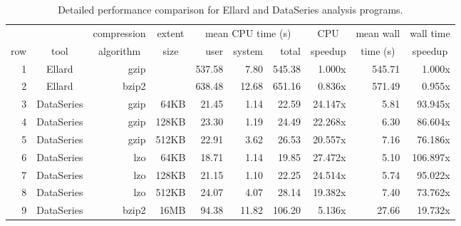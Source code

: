 \documentclass{acm_proc_article-sp}
\begin{document}

\begin{table*}
\centering
\caption{
Detailed performance comparison for Ellard and DataSeries analysis programs.}
\begin{tabular}{|r||c|r|r|r|r|r|r|r|r|} \hline
 &  & \multicolumn{1}{c|}{compression} & \multicolumn{1}{c|}{extent}  & \multicolumn{3}{c|}{mean CPU time (s)}     & \multicolumn{1}{c|}{CPU}     & \multicolumn{1}{c|}{mean wall}    & \multicolumn{1}{c|}{wall time} \\ \cline{5-7}
row & tool & \multicolumn{1}{c|}{algorithm} & \multicolumn{1}{c|}{size}  & user & system & total  & \multicolumn{1}{c|}{speedup} & \multicolumn{1}{c|}{time (s)} & \multicolumn{1}{c|}{speedup}  \\ \hline
1 &Ellard & gzip &  & 537.58    &  7.80     & 545.38   &  1.000x & 545.71   &   1.000x \\
2 & Ellard & bzip2 & & 638.48    & 12.68     & 651.16   &  0.836x & 571.49   &   0.955x \\
\hline
3 & DataSeries & gzip & 64KB   &  21.45    &  1.14     &  22.59   & 24.147x &   5.81   &  93.945x \\
4 & DataSeries & gzip & 128KB  &  23.30    &  1.19     &  24.49   & 22.268x &   6.30   &  86.604x \\
5 & DataSeries & gzip & 512KB  &  22.91    &  3.62     &  26.53   & 20.557x &   7.16   &  76.186x \\
\hline
6 & DataSeries & lzo & 64KB  &  18.71    &  1.14     &  19.85   & 27.472x &   5.10   & 106.897x \\
7 & DataSeries & lzo &128KB &  21.15    &  1.10     &  22.25   & 24.514x &   5.74   &  95.022x \\
8 & DataSeries & lzo &512KB &  24.07    &  4.07     &  28.14   & 19.382x &   7.40   &  73.762x \\ \hline
9 & DataSeries & bzip2 &16MB  &  94.38    & 11.82     & 106.20   &  5.136x &  27.66   &  19.732x \\
\hline
\end{tabular}

\label{tab:summary}
\end{table*}
\end{document}
